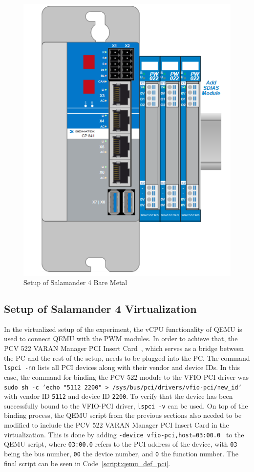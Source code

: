 \documentclass[MMR,Master,english]{style/twbook}
\begin{document}
\begin{figure}[H]
	\centering
	\includegraphics[width=0.45\columnwidth]{img/experiment/hardware_tree.png}
	\caption[Setup of Salamander 4 Bare Metal]{Setup of Salamander 4 Bare Metal}
	\label{fig:hardware_tree}
\end{figure}

\subsection{Setup of Salamander 4 Virtualization}\label{subsec:setup_experiment_virtualized}
In the virtualized setup of the experiment, the vCPU functionality of QEMU is used to connect QEMU with the PWM modules. In order to achieve that, the PCV 522 VARAN Manager PCI Insert Card~\cite{ControlsHMIsSIGMATEK}, which serves as a bridge between the PC and the rest of the setup, needs to be plugged into the PC. The command \texttt{lspci -nn} lists all PCI devices along with their vendor and device IDs. In this case, the command for binding the PCV 522 module to the VFIO-PCI driver was \texttt{sudo sh -c 'echo "5112 2200" > /sys/bus/pci/drivers/vfio-pci/new\_id'} with vendor ID \texttt{5112} and device ID \texttt{2200}.  To verify that the device has been successfully bound to the VFIO-PCI driver, \texttt{lspci -v} can be used. On top of the binding process, the QEMU script from the previous sections also needed to be modified to include the PCV 522 VARAN Manager PCI Insert Card in the virtualization. This is done by adding \texttt{-device\ vfio-pci,host=03:00.0 } to the QEMU script, where \texttt{03:00.0} refers to the PCI address of the device, with \texttt{03} being the bus number, \texttt{00} the device number, and \texttt{0} the function number. The final script can be seen in Code~\ref{script:qemu_def_pci}.
\end{document}
